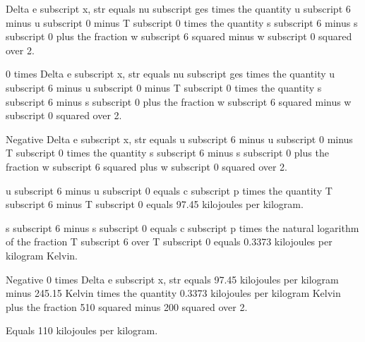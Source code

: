 Delta e subscript x, str equals nu subscript ges times the quantity u subscript 6 minus u subscript 0 minus T subscript 0 times the quantity s subscript 6 minus s subscript 0 plus the fraction w subscript 6 squared minus w subscript 0 squared over 2.

0 times Delta e subscript x, str equals nu subscript ges times the quantity u subscript 6 minus u subscript 0 minus T subscript 0 times the quantity s subscript 6 minus s subscript 0 plus the fraction w subscript 6 squared minus w subscript 0 squared over 2.

Negative Delta e subscript x, str equals u subscript 6 minus u subscript 0 minus T subscript 0 times the quantity s subscript 6 minus s subscript 0 plus the fraction w subscript 6 squared plus w subscript 0 squared over 2.

u subscript 6 minus u subscript 0 equals c subscript p times the quantity T subscript 6 minus T subscript 0 equals 97.45 kilojoules per kilogram.

s subscript 6 minus s subscript 0 equals c subscript p times the natural logarithm of the fraction T subscript 6 over T subscript 0 equals 0.3373 kilojoules per kilogram Kelvin.

Negative 0 times Delta e subscript x, str equals 97.45 kilojoules per kilogram minus 245.15 Kelvin times the quantity 0.3373 kilojoules per kilogram Kelvin plus the fraction 510 squared minus 200 squared over 2.

Equals 110 kilojoules per kilogram.